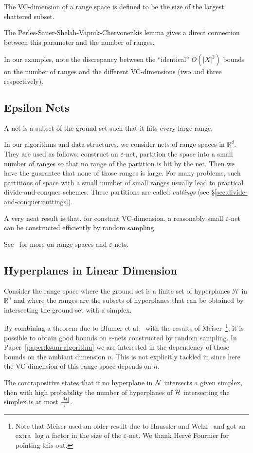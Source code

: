 The VC-dimension of a range space is defined to be the size of the largest
shattered subset.


The Perles-Sauer-Shelah-Vapnik-Chervonenkis lemma gives a direct connection
between this parameter and the number of ranges.
%

%
In our examples, note the discrepancy between the ``identical''
\(O({|X|}^2)\) bounds on the number of ranges and the different VC-dimensions
(two and three respectively).

\subsection{Epsilon Nets}
\label{sec:divide-and-conquer:epsilon-nets}

A net is a subset of the ground set such that it hits every large range.
%

%
In our algorithms and data structures,
%
we consider nets of range spaces in \(\mathbb{R}^d\).
They are used as follows: construct an \(\varepsilon\)-net,
partition the space into a small number of ranges so that no range of the
partition is hit by the net. Then we have the guarantee that none of those
ranges is large.
%
For many problems,
such partitions of space with a small number of
small ranges usually lead to practical divide-and-conquer schemes.
These partitions are called \emph{cuttings} (see
\S\ref{sec:divide-and-conquer:cuttings}).

A very neat result is that, for constant VC-dimension, a reasonably small
\(\varepsilon\)-net can be constructed efficiently by random sampling.


See~\cite[Section~40.4]{CMR04} for more on range spaces and \(\varepsilon\)-nets.

\subsection{Hyperplanes in Linear Dimension}

Consider the range space where the ground set is a finite set of hyperplanes
\(\mathcal{H}\) in \(\mathbb{R}^n\)
and where the ranges are the subsets of hyperplanes that can be obtained by
intersecting the ground set with a simplex.

By combining a theorem due to Blumer et
al.~\cite{BEHW89} with the results of Meiser~\cite{M93}\footnote{Note that
Meiser used an older result due to Haussler and Welzl~\cite{H87} and got an
extra $\log n$ factor in the size of the $\varepsilon$-net. We thank Hervé
Fournier for pointing this out.}, it is possible to
obtain good bounds on \(\varepsilon\)-nets constructed by
random sampling.
%
In Paper~\ref{paper:ksum-algorithm}
we are interested in the dependency of those bounds on the ambiant dimension
\(n\).
This is not explicitly tackled in 
since here the VC-dimension of this range space depends on \(n\).
%

%
The contrapositive states that if no hyperplane in \(\mathcal{N}\) intersects
a given simplex, then with high probability the number of hyperplanes of
\(\mathcal{H}\) intersecting the simplex is at most \(\frac{| \mathcal{H} |}{r}\).

